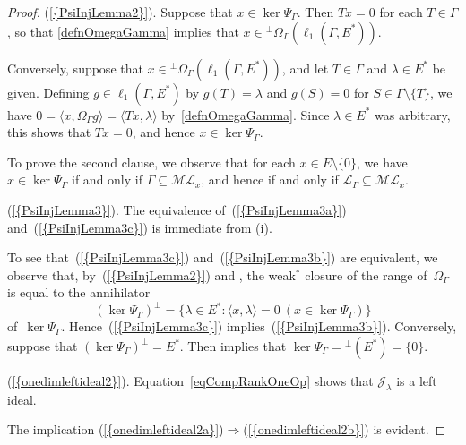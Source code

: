\documentclass[12pt]{amsart}
\theoremstyle{definition}
\numberwithin{equation}{section}
\begin{document}
\begin{proof}   
  {{\normalfont\textrm{(\ref{{PsiInjLemma2}})}}}. Suppose that $x\in\ker\Psi_\Gamma$. Then
  $Tx = 0$ for each $T\in\Gamma$, so that \eqref{defnOmegaGamma}
  implies that
  $x\in\mbox{}^\perp\Omega_\Gamma(\ell_1(\Gamma,E^*))$.

  Conversely, suppose that
  $x\in\mbox{}^\perp\Omega_\Gamma(\ell_1(\Gamma,E^*))$, and let
  $T\in\Gamma$ and $\lambda\in E^*$ be given. Defining
  $g\in\ell_1(\Gamma,E^*)$ by $g(T) = \lambda$ and $g(S) = 0$ for
  $S\in\Gamma\setminus\{T\}$, we have \mbox{$0 = \langle x, \Omega_\Gamma
  g\rangle = \langle Tx, \lambda\rangle$} by~\eqref{defnOmegaGamma}.
  Since $\lambda\in E^*$ was arbitrary, this shows that $Tx = 0$, and
  hence $x\in\ker\Psi_\Gamma$.

  To prove the second clause, we observe that for each $x\in
  E\setminus\{0\}$, we have $x\in\ker\Psi_{\Gamma}$ if and only if $
  \Gamma\subseteq\mathscr{M}\!\mathscr{L}_x$, and hence if and only if
  $ \mathscr{L}_{\Gamma}\subseteq \mathscr{M}\!\mathscr{L}_x$.

  {{\normalfont\textrm{(\ref{{PsiInjLemma3}})}}}. The equivalence of~{{\normalfont\textrm{(\ref{{PsiInjLemma3a}})}}}
  and~{{\normalfont\textrm{(\ref{{PsiInjLemma3c}})}}} is immediate from (i).

  To see that~{{\normalfont\textrm{(\ref{{PsiInjLemma3c}})}}} and~{{\normalfont\textrm{(\ref{{PsiInjLemma3b}})}}} are
  equivalent, we observe that, by~{{\normalfont\textrm{(\ref{{PsiInjLemma2}})}}} and
  \cite[Proposition~2.6.6(c)]{meg}, the weak$^*$ closure of the range
  of~$\Omega_\Gamma$ is equal to the annihilator
  \[ (\ker\Psi_\Gamma)^\perp = \bigl\{\lambda\in E^* : \langle
  x,\lambda\rangle = 0\ (x\in\ker\Psi_\Gamma)\bigr\} \]
  of~$\ker\Psi_\Gamma$. Hence~{{\normalfont\textrm{(\ref{{PsiInjLemma3c}})}}}
  implies~{{\normalfont\textrm{(\ref{{PsiInjLemma3b}})}}}. Conversely, suppose that
  $(\ker\Psi_\Gamma)^\perp = E^*$. Then
  \cite[Proposition~1.10.15(c)]{meg} implies that $\ker\Psi_\Gamma =
  \mbox{}^\perp(E^*) = \{0\}$.
   
  {{\normalfont\textrm{(\ref{{onedimleftideal2}})}}}.  Equation~\eqref{eqCompRankOneOp} shows
  that $\mathscr{J}_\lambda$ is a left ideal.

  The implication
  {{\normalfont\textrm{(\ref{{onedimleftideal2a}})}}}$\Rightarrow${{\normalfont\textrm{(\ref{{onedimleftideal2b}})}}}
  is evident.


\end{proof}
\end{document}
